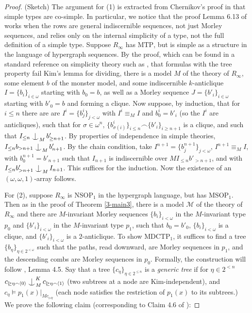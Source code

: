 \documentclass[12pt]{amsart}
\theoremstyle{definition}
\def\Ind#1#2{#1\setbox0=\hbox{$#1x$}\kern\wd0\hbox to 0pt{\hss$#1\mid$\hss}
\lower.9\ht0\hbox to 0pt{\hss$#1\smile$\hss}\kern\wd0}
\def\ind{\mathop{\mathpalette\Ind{}}}
\begin{document}
\begin{proof} (Sketch)
    The argument for (1) is extracted from Chernikov's proof in \cite{Che14} that simple types are co-simple. In particular, we notice that the proof Lemma 6.13 of \cite{Che14} works when the rows are general indiscernible sequences, not just Morley sequences, and relies only on the internal simplicity of a type, not the full definition of a simple type. Suppose $R_{\infty}$ has $\mathrm{MTP}$, but is simple as a structure in the language of hypergraph sequences. By the proof, which can be found in a standard reference on simplicity theory such as \cite{Kim14}, that formulas with the tree property fail Kim's lemma for dividing, there is a model $M$ of the theory of $R_{\infty}$, some element $b$ of the monster model, and some indiscernible $k$-anticlique $I=\{b_{i}\}_{i \in \omega}$ starting with $b_{0}=b$, as well as a Morley sequence $J=\{b'_{i}\}_{i \in \omega}$ starting with $b'_{0}=b$ and forming a clique. Now suppose, by induction, that for $i \leq n$ there are are $I^{i}=\{b_{j}^{i}\}_{j < \omega}$ with $I^{i} \equiv_{M} I$ and $b_{0}^{i}=b'_{i}$ (so the $I^{i}$ are anticliques), such that for $\sigma \in \omega^{n}$, $\{b^{i}_{\sigma(i)}\}_{i \leq n} \smallfrown \{b'_{i}\}_{i \geq n+1}$ is a clique, and such that $I_{\leq n}\ind_{M} b'_{\geq n+1}$. By properties of independence in simple theories, $I_{\leq n} b_{>n+1}\ind_{M} b'_{ n+1}$. By the chain condition, take $I^{n+1} = \{b_{j}^{n+1}\}_{j < \omega}$, $I^{n+1} \equiv_{M} I$, with $b^{n+1}_{0}=b'_{n+1}$ such that $I_{n+1}$ is indiscernible over $MI_{\leq n} b'_{>n+1}$, and with $I_{\leq n} b'_{>n+1}\ind_{M} I_{ n+1}$. This suffices for the induction. Now the existence of an $(\omega, \omega, 1)$-array follows.


    For (2), suppose $R_{\infty}$ is $\mathrm{NSOP}_{1}$ in the hypergraph language, but has $\mathrm{MSOP}_{1}$. Then as in the proof of Theorem \ref{3-main3}, there is a model $\mathcal{M}$ of the theory of $R_{\infty}$ and there are $M$-invariant Morley sequences $\{b_{i}\}_{i < \omega}$ in the $M$-invariant type $p_{0}$ and $\{b'_{i}\}_{i < \omega}$ in the $M$-invariant type $p_{1}$, such that $b_{0}= b'_{0}$, $\{b_{i}\}_{i < \omega}$ is a clique, and $\{b'_{i}\}_{i < \omega}$ is a $2$-anticlique. To show $\mathrm{MDCTP}_{1}$, it suffices to find a tree $\{b_{\eta}\}_{\eta \in 2^{<\omega}}$ such that the paths, read downward, are Morley sequences in $p_{1}$, and the descending combs are Morley sequences in $p_{0}$. Formally, the construction will follow \cite{NSOP2}, Lemma 4.5. Say that a tree $\{c_{\eta}\}_{\eta \in 2^{\leq n}}$ is a \textit{generic tree} if for $\eta \in 2^{< n}$ $c_{\unrhd \eta \smallfrown \langle 0 \rangle } \ind^{K}_{M} c_{\unrhd \eta \smallfrown \langle 1 \rangle }$ (two subtrees at a node are Kim-independent), and $c_{\eta } \models p_{1}(x)|_{M c_{\rhd \eta}}$ (each node satisfies the restriction of $p_{1} (x)$ to its subtrees.) We prove the following claim (corresponding to Claim 4.6 of \cite{NSOP2}):


\end{proof}
\end{document}
